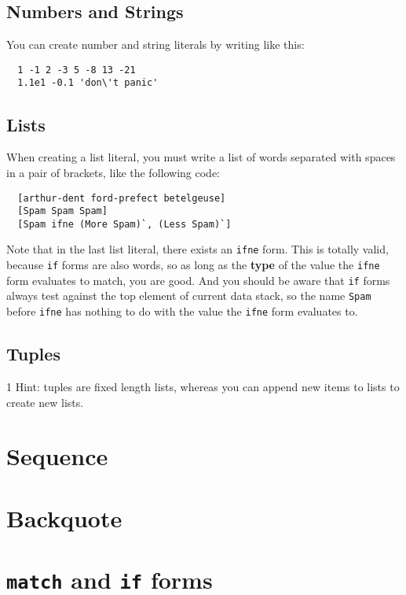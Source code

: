 \documentclass{book}
\begin{document}
\subsection{Numbers and Strings}

You can create number and string literals by writing like this:
\begin{verbatim}
  1 -1 2 -3 5 -8 13 -21
  1.1e1 -0.1 'don\'t panic'
\end{verbatim}

\subsection{Lists}

When creating a list literal, you must write a list of words separated with spaces in a pair of brackets, like the following code:
\begin{verbatim}
  [arthur-dent ford-prefect betelgeuse]
  [Spam Spam Spam]
  [Spam ifne (More Spam)`, (Less Spam)`]
\end{verbatim}

Note that in the last list literal, there exists an \texttt{ifne} form. This
is totally valid, because \texttt{if} forms are also words, so as long as the \textbf{type} of the value the \texttt{ifne} form evaluates to match, you are good. And you should be aware that \texttt{if} forms always test against the top element of current data stack, so the name \texttt{Spam} before \texttt{ifne} has nothing to do with the value the \texttt{ifne} form evaluates to.

\subsection{Tuples}

1 Hint: tuples are fixed length lists, whereas you can append new items to lists to create new lists.

\section{Sequence}

\section{Backquote}

\section{\texttt{match} and \texttt{if} forms}
\end{document}
